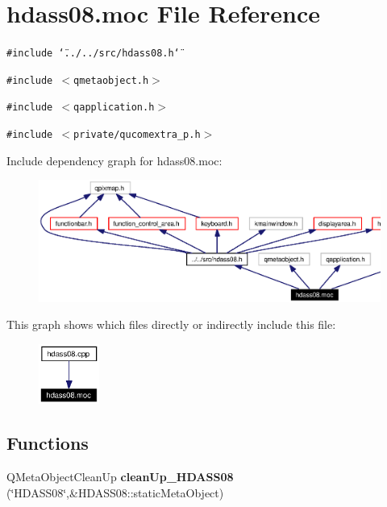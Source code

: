 \section{hdass08.moc File Reference}
\label{hdass08_8moc}


{\tt \#include \char`\"{}../../src/hdass08.h\char`\"{}}\par
{\tt \#include $<$qmetaobject.h$>$}\par
{\tt \#include $<$qapplication.h$>$}\par
{\tt \#include $<$private/qucomextra\_\-p.h$>$}\par


Include dependency graph for hdass08.moc:\begin{figure}[H]
\begin{center}
\leavevmode
\includegraphics[width=359pt]{hdass08_8moc__incl}
\end{center}
\end{figure}


This graph shows which files directly or indirectly include this file:\begin{figure}[H]
\begin{center}
\leavevmode
\includegraphics[width=56pt]{hdass08_8moc__dep__incl}
\end{center}
\end{figure}
\subsection*{Functions}
\begin{CompactItemize}
\item 
QMeta\-Object\-Clean\-Up {\bf clean\-Up\_\-HDASS08} (\char`\"{}HDASS08\char`\"{},\&HDASS08::static\-Meta\-Object)
\end{CompactItemize}



